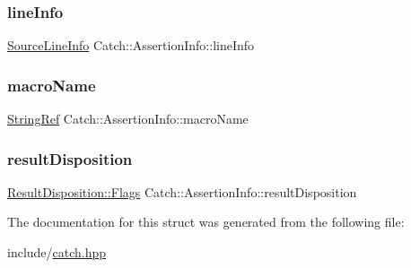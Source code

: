 \mbox{\label{struct_catch_1_1_assertion_info_a17bdbb404ba12658034f833be2f4c3e7}} 
\subsubsection{\texorpdfstring{lineInfo}{lineInfo}}
{\footnotesize\ttfamily \mbox{\hyperlink{struct_catch_1_1_source_line_info}{Source\+Line\+Info}} Catch\+::\+Assertion\+Info\+::line\+Info}

\mbox{\label{struct_catch_1_1_assertion_info_aaf3fbb9f1fe09c879ba3d877584e3056}} 
\subsubsection{\texorpdfstring{macroName}{macroName}}
{\footnotesize\ttfamily \mbox{\hyperlink{class_catch_1_1_string_ref}{String\+Ref}} Catch\+::\+Assertion\+Info\+::macro\+Name}

\mbox{\label{struct_catch_1_1_assertion_info_a60353b3632ab2f827162f2b2d6911073}} 
\subsubsection{\texorpdfstring{resultDisposition}{resultDisposition}}
{\footnotesize\ttfamily \mbox{\hyperlink{struct_catch_1_1_result_disposition_a3396cad6e2259af326b3aae93e23e9d8}{Result\+Disposition\+::\+Flags}} Catch\+::\+Assertion\+Info\+::result\+Disposition}



The documentation for this struct was generated from the following file\+:\begin{DoxyCompactItemize}
\item 
include/\mbox{\hyperlink{catch_8hpp}{catch.\+hpp}}\end{DoxyCompactItemize}
